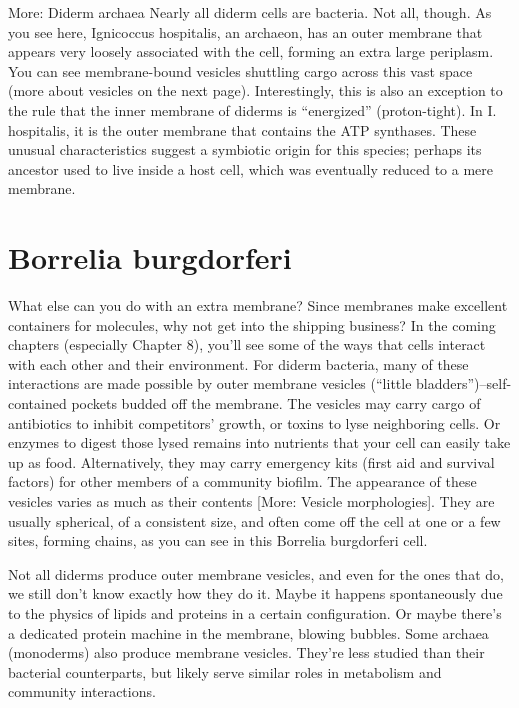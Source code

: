 \documentclass[]{tufte-book}
\begin{document}
More: Diderm archaea Nearly all diderm cells are bacteria. Not all,
though. As you see here, Ignicoccus hospitalis, an archaeon, has an
outer membrane that appears very loosely associated with the cell,
forming an extra large periplasm. You can see membrane-bound vesicles
shuttling cargo across this vast space (more about vesicles on the next
page). Interestingly, this is also an exception to the rule that the
inner membrane of diderms is ``energized'' (proton-tight). In I.
hospitalis, it is the outer membrane that contains the ATP synthases.
These unusual characteristics suggest a symbiotic origin for this
species; perhaps its ancestor used to live inside a host cell, which was
eventually reduced to a mere membrane.

\section{Borrelia burgdorferi}\label{borrelia-burgdorferi}

What else can you do with an extra membrane? Since membranes make
excellent containers for molecules, why not get into the shipping
business? In the coming chapters (especially Chapter 8), you'll see some
of the ways that cells interact with each other and their environment.
For diderm bacteria, many of these interactions are made possible by
outer membrane vesicles (``little bladders'')--self-contained pockets
budded off the membrane. The vesicles may carry cargo of antibiotics to
inhibit competitors' growth, or toxins to lyse neighboring cells. Or
enzymes to digest those lysed remains into nutrients that your cell can
easily take up as food. Alternatively, they may carry emergency kits
(first aid and survival factors) for other members of a community
biofilm. The appearance of these vesicles varies as much as their
contents {[}More: Vesicle morphologies{]}. They are usually spherical,
of a consistent size, and often come off the cell at one or a few sites,
forming chains, as you can see in this Borrelia burgdorferi cell.

Not all diderms produce outer membrane vesicles, and even for the ones
that do, we still don't know exactly how they do it. Maybe it happens
spontaneously due to the physics of lipids and proteins in a certain
configuration. Or maybe there's a dedicated protein machine in the
membrane, blowing bubbles. Some archaea (monoderms) also produce
membrane vesicles. They're less studied than their bacterial
counterparts, but likely serve similar roles in metabolism and community
interactions.
\end{document}
